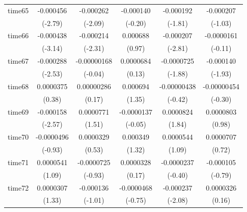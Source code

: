 \begin{table}[htbp]
\begin{tabular}{l*{5}{c}}
time65      &   -0.000456\sym{**} &   -0.000262\sym{*}  &   -0.000140         &   -0.000192         &   -0.000207         \\
            &     (-2.79)         &     (-2.09)         &     (-0.20)         &     (-1.81)         &     (-1.03)         \\
time66      &   -0.000438\sym{**} &   -0.000214\sym{*}  &    0.000688         &   -0.000207\sym{**} &  -0.0000161         \\
            &     (-3.14)         &     (-2.31)         &      (0.97)         &     (-2.81)         &     (-0.11)         \\
time67      &   -0.000288\sym{*}  & -0.00000168         &   0.0000684         &  -0.0000725         &   -0.000140         \\
            &     (-2.53)         &     (-0.04)         &      (0.13)         &     (-1.88)         &     (-1.93)         \\
time68      &   0.0000375         &  0.00000286         &    0.000694         & -0.00000438         & -0.00000454         \\
            &      (0.38)         &      (0.17)         &      (1.35)         &     (-0.42)         &     (-0.30)         \\
time69      &   -0.000158\sym{*}  &   0.0000771         &  -0.0000137         &   0.0000824         &   0.0000803         \\
            &     (-2.57)         &      (1.51)         &     (-0.05)         &      (1.84)         &      (0.98)         \\
time70      &  -0.0000496         &   0.0000329         &    0.000349         &   0.0000544         &   0.0000707         \\
            &     (-0.93)         &      (0.53)         &      (1.32)         &      (1.09)         &      (0.72)         \\
time71      &   0.0000541         &  -0.0000725         &   0.0000328         &  -0.0000237         &   -0.000105         \\
            &      (1.09)         &     (-0.93)         &      (0.17)         &     (-0.40)         &     (-0.79)         \\
time72      &   0.0000307         &   -0.000136         &  -0.0000468         &   -0.000237\sym{*}  &   0.0000326         \\
            &      (1.33)         &     (-1.01)         &     (-0.75)         &     (-2.08)         &      (0.16)         \\

\end{tabular}
\end{table}
